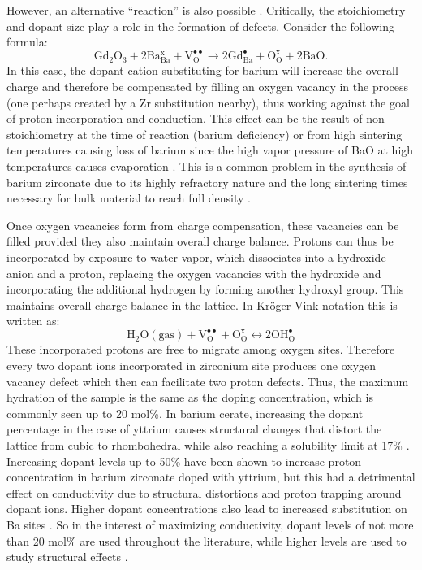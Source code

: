 However, an alternative ``reaction'' is also possible \cite{Ding2018, Han2014}. Critically, the stoichiometry and dopant size play a role in the formation of defects. Consider the following formula:
\begin{equation}
\mathrm{Gd_2 O_3 + 2 Ba_{Ba}^x + V_O^{\bullet\bullet} \rightarrow 2 Gd_{Ba}^{\bullet} + O_O^x + 2 Ba O}.
\label{eq:back:bariumSubstitution}
\end{equation}
In this case, the dopant cation substituting for barium will increase the overall charge and therefore be compensated by filling an oxygen vacancy in the process (one perhaps created by a Zr substitution nearby), thus working against the goal of proton incorporation and conduction. This effect can be the result of non-stoichiometry at the time of reaction (barium deficiency) or from high sintering temperatures causing loss of barium since the high vapor pressure of BaO at high temperatures causes evaporation \cite{Babilo2005}. This is a common problem in the synthesis of barium zirconate due to its highly refractory nature and the long sintering times necessary for bulk material to reach full density \cite{Haile2010, Tong2010}.

Once oxygen vacancies form from charge compensation, these vacancies can be filled provided they also maintain overall charge balance. Protons can thus be incorporated by exposure to water vapor, which dissociates into a hydroxide anion and a proton, replacing the oxygen vacancies with the hydroxide and incorporating the additional hydrogen by forming another hydroxyl group. This maintains overall charge balance in the lattice. In Kr\"oger-Vink notation this is written as: 
\begin{equation}
\mathrm{H_2 O (gas) + V_O^{\bullet\bullet} + O_O^x \leftrightarrow 2 OH_O^{\bullet}}
\end{equation}
These incorporated protons are free to migrate among oxygen sites. Therefore every two dopant ions incorporated in zirconium site produces one oxygen vacancy defect which then can facilitate two proton defects. Thus, the maximum hydration of the sample is the same as the doping concentration, which is commonly seen up to 20 mol\%. In barium cerate, increasing the dopant percentage in the case of yttrium causes structural changes that distort the lattice from cubic to rhombohedral \cite{Takeuchi2000} while also reaching a solubility limit at 17\% \cite{Giannici2007}. Increasing dopant levels up to 50\% have been shown to increase proton concentration in barium zirconate doped with yttrium, but this had a detrimental effect on conductivity due to structural distortions and proton trapping around dopant ions. Higher dopant concentrations also lead to increased substitution on Ba sites \cite{Fabbri2010c, Park2010}. So in the interest of maximizing conductivity, dopant levels of not more than 20 mol\% are used throughout the literature, while higher levels are used to study structural effects \cite{Han2016}.  